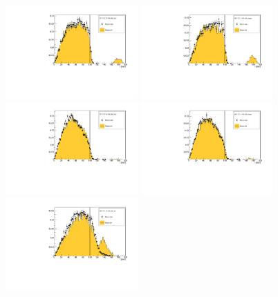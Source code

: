\begin{figure}[!tbh]
    \centering
    \includegraphics*[width=0.45\textwidth]{02-Cuts/Figures/2017-2.7_3-140_lH2_full/global_through_virtual_diffuser_us_r_us_cut.pdf}
    \includegraphics*[width=0.45\textwidth]{02-Cuts/Figures/2017-2.7_3-140_lH2_empty/global_through_virtual_diffuser_us_r_us_cut.pdf}
    \includegraphics*[width=0.45\textwidth]{02-Cuts/Figures/2017-2.7_6-140_lH2_full/global_through_virtual_diffuser_us_r_us_cut.pdf}
    \includegraphics*[width=0.45\textwidth]{02-Cuts/Figures/2017-2.7_6-140_lH2_empty/global_through_virtual_diffuser_us_r_us_cut.pdf}
    \includegraphics*[width=0.45\textwidth]{02-Cuts/Figures/2017-2.7_10-140_lH2_full/global_through_virtual_diffuser_us_r_us_cut.pdf}

\end{figure}
